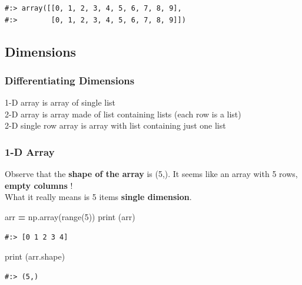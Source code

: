 \documentclass[
]{book}
\newenvironment{Shaded}{\begin{snugshade}}{\end{snugshade}}
\newcommand{\BuiltInTok}[1]{#1}
\newcommand{\DecValTok}[1]{\textcolor[rgb]{0.06,0.06,0.06}{#1}}
\newcommand{\NormalTok}[1]{#1}
\newcommand{\OperatorTok}[1]{\textcolor[rgb]{0.43,0.43,0.43}{\textbf{#1}}}
\begin{document}
\begin{verbatim}
#:> array([[0, 1, 2, 3, 4, 5, 6, 7, 8, 9],
#:>        [0, 1, 2, 3, 4, 5, 6, 7, 8, 9]])
\end{verbatim}

\hypertarget{dimensions}{%
\subsection{Dimensions}\label{dimensions}}

\hypertarget{differentiating-dimensions}{%
\subsubsection{Differentiating Dimensions}\label{differentiating-dimensions}}

1-D array is array of single list\\
2-D array is array made of list containing lists (each row is a list)\\
2-D single row array is array with list containing just one list

\hypertarget{d-array-1}{%
\subsubsection{1-D Array}\label{d-array-1}}

Observe that the \textbf{shape of the array} is (5,). It seems like an array with 5 rows, \textbf{empty columns} !\\
What it really means is 5 items \textbf{single dimension}.

\begin{Shaded}
\begin{Highlighting}[]
\NormalTok{arr }\OperatorTok{=}\NormalTok{ np.array(}\BuiltInTok{range}\NormalTok{(}\DecValTok{5}\NormalTok{))}
\BuiltInTok{print}\NormalTok{ (arr)}
\end{Highlighting}
\end{Shaded}

\begin{verbatim}
#:> [0 1 2 3 4]
\end{verbatim}

\begin{Shaded}
\begin{Highlighting}[]
\BuiltInTok{print}\NormalTok{ (arr.shape)}
\end{Highlighting}
\end{Shaded}

\begin{verbatim}
#:> (5,)
\end{verbatim}
\end{document}
